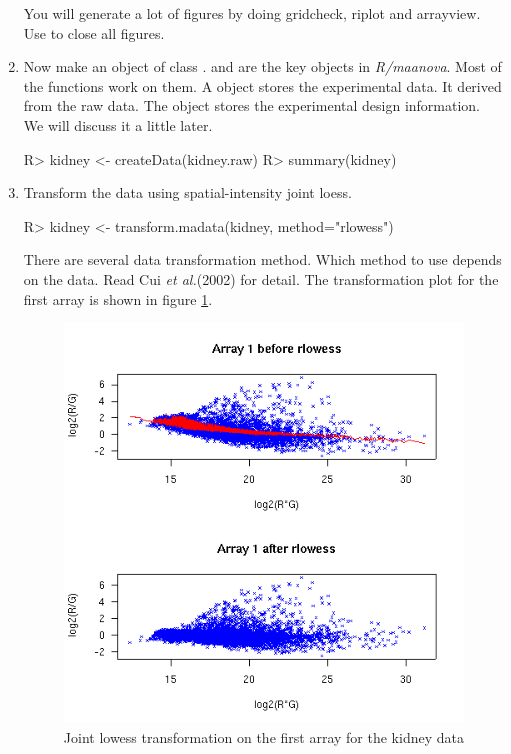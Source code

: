 \begin{enumerate}
You will generate a lot of figures by doing 
gridcheck, riplot and arrayview. Use
 to close all figures.

\item Now make an object of class .
 and 
are the key objects in {\em R/maanova}. Most of the functions work on
them. A  object stores the experimental data. It derived
from the raw data. The  object stores the experimental 
design information. We will discuss it a little later.
\begin{Sinput}
R> kidney <- createData(kidney.raw)
R> summary(kidney)
\end{Sinput}

\item Transform the data using spatial-intensity joint loess.
\begin{Sinput}
R> kidney <- transform.madata(kidney, method="rlowess")
\end{Sinput}

There are several data transformation method. Which method to use depends on
the data. Read Cui {\it et al.}(2002) for detail. The transformation
plot for the first array is shown in figure \ref{fig:lowess}.

\begin{figure}[htbp]
\centering
\includegraphics{rlowess.png}
\caption{Joint lowess transformation on the first array for the kidney data}
\label{fig:lowess}
\end{figure}


\end{enumerate}
